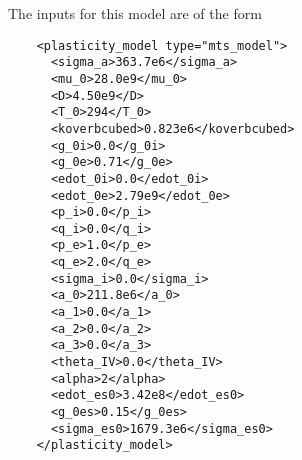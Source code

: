   The inputs for this model are of the form
  \begin{verbatim}
    <plasticity_model type="mts_model">
      <sigma_a>363.7e6</sigma_a>
      <mu_0>28.0e9</mu_0>
      <D>4.50e9</D>
      <T_0>294</T_0>
      <koverbcubed>0.823e6</koverbcubed>
      <g_0i>0.0</g_0i>
      <g_0e>0.71</g_0e>
      <edot_0i>0.0</edot_0i>
      <edot_0e>2.79e9</edot_0e>
      <p_i>0.0</p_i>
      <q_i>0.0</q_i>
      <p_e>1.0</p_e>
      <q_e>2.0</q_e>
      <sigma_i>0.0</sigma_i>
      <a_0>211.8e6</a_0>
      <a_1>0.0</a_1>
      <a_2>0.0</a_2>
      <a_3>0.0</a_3>
      <theta_IV>0.0</theta_IV>
      <alpha>2</alpha>
      <edot_es0>3.42e8</edot_es0>
      <g_0es>0.15</g_0es>
      <sigma_es0>1679.3e6</sigma_es0>
    </plasticity_model>
  \end{verbatim}

